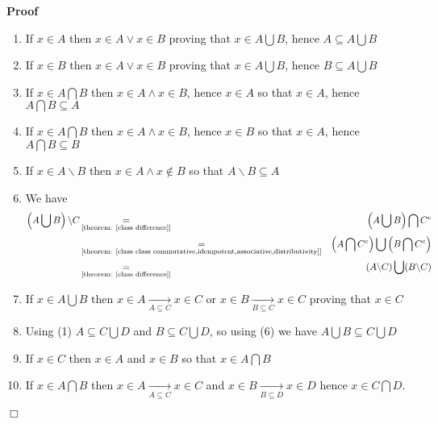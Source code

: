\documentclass{book}
\newcommand{\Rightarrowlim}{\mathop{\rightarrow}\limits}
\newcommand{\equallim}{\mathop{=}\limits}
\newcommand{\nin}{\not\in}
\newenvironment{proof}{\noindent\textbf{Proof\ }}{\hspace*{\fill}$\Box$\medskip}
\begin{document}
\begin{proof}
  
  \begin{enumerate}
    \item If $x \in A$ then $x \in A \vee x \in B$ proving that $x \in A
    \bigcup B$, hence $A \subseteq A \bigcup B$
    
    \item If $x \in B$ then $x \in A \vee x \in B$ proving that $x \in A
    \bigcup B$, hence $B \subseteq A \bigcup B$
    
    \item If $x \in A \bigcap B$ then $x \in A \wedge x \in B$, hence $x \in
    A$ so that $x \in A$, hence $A \bigcap B \subseteq A$
    
    \item If $x \in A \bigcap B$ then $x \in A \wedge x \in B$, hence $x \in
    B$ so that $x \in A$, hence $A \bigcap B \subseteq B$
    
    \item If $x \in A\backslash B$ then $x \in A \wedge x \nin B$ so that
    $A\backslash B \subseteq A$
    
    \item We have
    \begin{eqnarray*}
      \left( A \bigcup B \right) \backslash C & \equallim_{\text{[theorem:
      \ref{class difference}]}} & \left( A \bigcup B \right) \bigcap C^c\\
      & \equallim_{\text{[theorem: \ref{class class
      commutative,idempotent,associative,distributivity}]}} & \left( A \bigcap
      C^c \right) \bigcup \left( B \bigcap C^c \right)\\
      & \equallim_{\text{[theorem: \ref{class difference}]}} & (A\backslash
      C) \bigcup (B\backslash C)
    \end{eqnarray*}
    \item If $x \in A \bigcup B$ then $x \in A \Rightarrowlim_{A \subseteq C}
    x \in C$ or $x \in B \Rightarrowlim_{B \subseteq C} x \in C$ proving that
    $x \in C$
    
    \item Using (1) $A \subseteq C \bigcup D$ and $B \subseteq C \bigcup D$,
    so using (6) we have $A \bigcup B \subseteq C \bigcup D$
    
    \item If $x \in C$ then $x \in A$ and $x \in B$ so that $x \in A \bigcap
    B$
    
    \item If $x \in A \bigcap B$ then $x \in A \Rightarrowlim_{A \subseteq C}
    x \in C$ and $x \in B \Rightarrowlim_{B \subseteq D} x \in D$ hence $x \in
    C \bigcap D$.
  \end{enumerate}
  
\end{proof}
\end{document}
